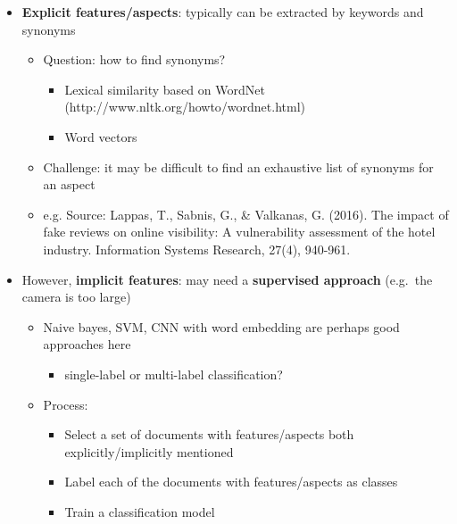 \documentclass[11pt]{article}
\providecommand{\tightlist}{%
      \setlength{\itemsep}{0pt}\setlength{\parskip}{0pt}}
\begin{document}
\begin{itemize}
\tightlist
\item
  \textbf{Explicit features/aspects}: typically can be extracted by
  keywords and synonyms

  \begin{itemize}
  \tightlist
  \item
    Question: how to find synonyms?

    \begin{itemize}
    \tightlist
    \item
      Lexical similarity based on WordNet
      (http://www.nltk.org/howto/wordnet.html)
    \item
      Word vectors
    \end{itemize}
  \item
    Challenge: it may be difficult to find an exhaustive list of
    synonyms for an aspect
  \item
    e.g. Source: Lappas, T., Sabnis, G., \& Valkanas, G. (2016). The
    impact of fake reviews on online visibility: A vulnerability
    assessment of the hotel industry. Information Systems Research,
    27(4), 940-961.
  \end{itemize}
\item
  However, \textbf{implicit features}: may need a \textbf{supervised
  approach} (e.g.~the camera is too large)

  \begin{itemize}
  \tightlist
  \item
    Naive bayes, SVM, CNN with word embedding are perhaps good
    approaches here

    \begin{itemize}
    \tightlist
    \item
      single-label or multi-label classification?
    \end{itemize}
  \item
    Process:

    \begin{itemize}
    \tightlist
    \item
      Select a set of documents with features/aspects both
      explicitly/implicitly mentioned
    \item
      Label each of the documents with features/aspects as classes
    \item
      Train a classification model
    \end{itemize}
  \end{itemize}
\end{itemize}
\end{document}

